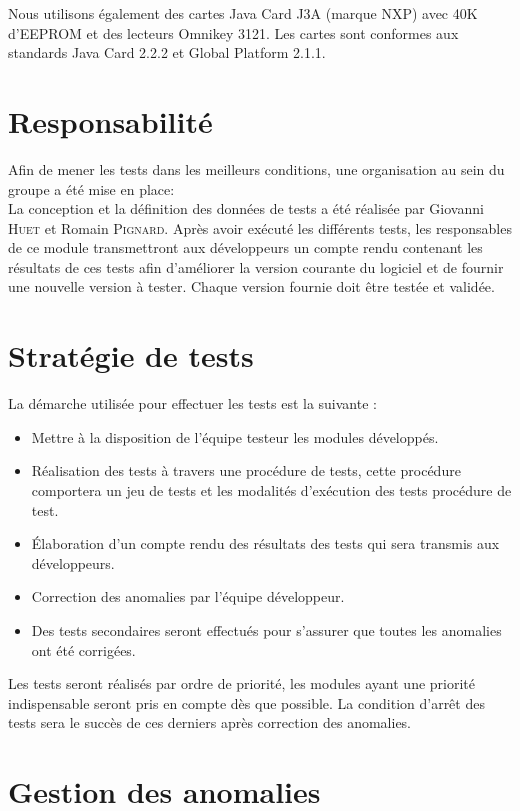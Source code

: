 \documentclass[a4paper,11pt,french]{article}
\begin{document}
Nous utilisons également des cartes Java Card J3A (marque NXP) avec 40K d'EEPROM et des lecteurs Omnikey 3121.
Les cartes sont conformes aux standards Java Card 2.2.2 et Global Platform 2.1.1.

\section{Responsabilité}
Afin de mener les tests dans les meilleurs conditions, une organisation au sein du groupe a été mise en place: \\

La conception et la définition des données de tests a été réalisée par Giovanni \textsc{Huet} et Romain \textsc{Pignard}. 
Après avoir exécuté les différents tests, les responsables de ce module transmettront aux développeurs un compte rendu contenant
les résultats de ces tests afin d’améliorer la version courante du logiciel et de fournir une nouvelle
version à tester. Chaque version fournie doit être testée et validée.

\section{Stratégie de tests}

La démarche utilisée pour effectuer les tests est la suivante :
\begin{itemize}
\item Mettre à la disposition de l’équipe testeur les modules développés.
\item Réalisation des tests à travers une procédure de tests, cette procédure comportera un jeu
de tests et les modalités d’exécution des tests procédure de test.
\item Élaboration d'un compte rendu des résultats des tests qui sera transmis aux développeurs.
\item Correction des anomalies par l'équipe développeur.
\item Des tests secondaires seront effectués pour s'assurer que toutes les anomalies ont été corrigées.
\end{itemize}

Les tests seront réalisés par ordre de priorité, les modules ayant une priorité indispensable seront
pris en compte dès que possible. La condition d'arrêt des tests sera le succès de ces derniers après correction 
des anomalies.

\section{Gestion des anomalies}
\end{document}
